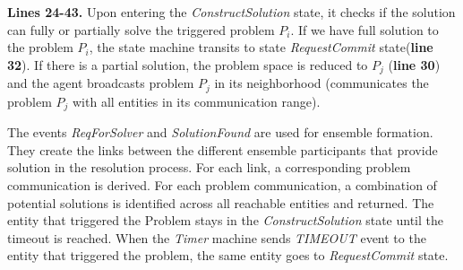 \documentclass[journal]{IEEEtran}
\theoremstyle{definition}
\begin{document}
\textbf{Lines 24-43.} Upon entering the \textit{ConstructSolution} state, 
it checks if the solution can fully or partially solve the triggered problem $P_i$. If we have full solution to the problem $P_i$, the state machine transits to state \textit{RequestCommit} state(\textbf{line 32}).
If there is a partial solution, the problem space is reduced to $P_j$ (\textbf{line 30}) and  the agent broadcasts problem $P_j$ in its neighborhood (communicates the problem $P_j$ with all entities in its communication range).

The events \textit{ReqForSolver} and \textit{SolutionFound} are used for ensemble formation. 
They create the links between the different ensemble participants that provide solution in the resolution process. For each link, a corresponding problem communication is derived. For each problem communication, a combination of potential solutions is identified across all reachable entities and returned. The entity that triggered the Problem stays in the \textit{ConstructSolution} state until the timeout is reached. When the \textit{Timer} machine sends \textit{TIMEOUT} event to the entity that triggered the problem, the same entity goes to \textit{RequestCommit} state.
\end{document}
